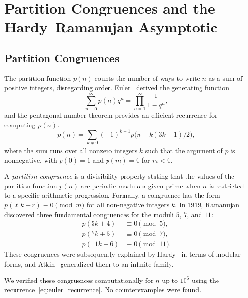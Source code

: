 \documentclass[10pt]{amsart}
\theoremstyle{plain}
\theoremstyle{definition}
\theoremstyle{remark}
\begin{document}
\section{Partition Congruences and the Hardy--Ramanujan Asymptotic}
\label{sec:partitions}

\subsection{Partition Congruences}

The partition function $p(n)$ counts the number of ways to write $n$ as
a sum of positive integers, disregarding order. Euler~\cite{euler_1748}
derived the generating function
\begin{equation}
\label{eq:partition_generating}
\sum_{n=0}^{\infty} p(n) q^n = \prod_{n=1}^{\infty} \frac{1}{1-q^n},
\end{equation}
and the pentagonal number theorem provides an efficient recurrence for
computing $p(n)$:
\begin{equation}
\label{eq:euler_recurrence}
p(n) = \sum_{k \neq 0} (-1)^{k-1} p\bigl(n - k(3k-1)/2\bigr),
\end{equation}
where the sum runs over all nonzero integers $k$ such that the argument
of $p$ is nonnegative, with $p(0)=1$ and $p(m)=0$ for $m<0$.

A \emph{partition congruence} is a divisibility property stating that the values of the partition function $p(n)$ are periodic modulo a given prime when $n$ is restricted to a specific arithmetic progression. Formally, a congruence has the form $p(\ell k + r) \equiv 0 \pmod{m}$ for all non-negative integers $k$. In 1919, Ramanujan~\cite{ramanujan_1919} discovered three fundamental congruences for the moduli $5$, $7$, and $11$:
\begin{align}
p(5k+4) &\equiv 0 \pmod{5}, \\
p(7k+5) &\equiv 0 \pmod{7}, \\
p(11k+6) &\equiv 0 \pmod{11}.
\end{align}
These congruences were subsequently explained by Hardy~\cite{hardy_1921}
in terms of modular forms, and Atkin~\cite{atkin_1966} generalized them
to an infinite family.

We verified these congruences computationally for $n$ up to $10^6$
using the recurrence~\eqref{eq:euler_recurrence}. No counterexamples
were found.
\end{document}
